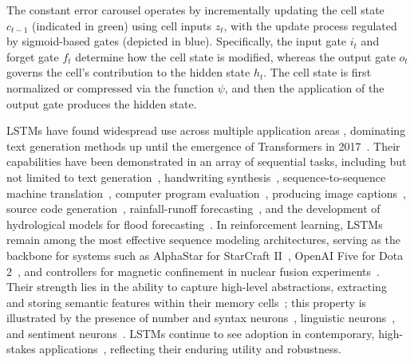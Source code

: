 The constant error carousel operates by incrementally updating the cell state $c_{t-1}$ (indicated in green) using cell inputs $z_t$, with the update process regulated by sigmoid-based gates (depicted in blue). Specifically, the input gate $i_t$ and forget gate $f_t$ determine how the cell state is modified, whereas the output gate $o_t$ governs the cell’s contribution to the hidden state $h_t$. The cell state is first normalized or compressed via the function $\psi$, and then the application of the output gate produces the hidden state.

LSTMs have found widespread use across multiple application areas \citep{Hochreiter:01,Hochreiter:07,Schmidhuber:15}, dominating text generation methods up until the emergence of Transformers in 2017~\citep{Vaswani:17}. Their capabilities have been demonstrated in an array of sequential tasks, including but not limited to text generation~\citep{Graves:13,Karpathy:15blog}, handwriting synthesis~\citep{Graves:13}, sequence-to-sequence machine translation~\citep{Sutskever:14nips}, computer program evaluation~\citep{Zaremba:14arxiv}, producing image captions~\citep{Karpathy:15,Hossain:19}, source code generation~\citep{Karpathy:15blog}, rainfall-runoff forecasting~\citep{Kratzert:18,Kratzert:19}, and the development of hydrological models for flood forecasting~\citep{Nearing:24}. In reinforcement learning, LSTMs remain among the most effective sequence modeling architectures, serving as the backbone for systems such as AlphaStar for StarCraft II~\citep{Vinyals:17short}, OpenAI Five for Dota 2~\citep{OpenAI:19}, and controllers for magnetic confinement in nuclear fusion experiments~\citep{Degrave:22short}. Their strength lies in the ability to capture high-level abstractions, extracting and storing semantic features within their memory cells~\citep{Karpathy:15blog}; this property is illustrated by the presence of number and syntax neurons~\citep{Lakretz:19}, linguistic neurons~\citep{Bau:19}, and sentiment neurons~\citep{Radford:17arxiv}. LSTMs continue to see adoption in contemporary, high-stakes applications~\citep{Degrave:22short,Nearing:24}, reflecting their enduring utility and robustness.

